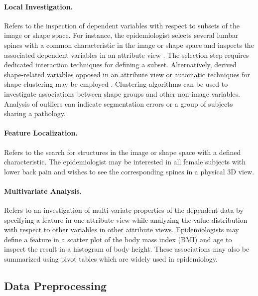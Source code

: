 \documentclass[journal]{style/vgtc} 			          %
\begin{document}
\paragraph{Local Investigation.} Refers to the inspection of dependent variables with respect to subsets of the image or shape space.
%
For instance, the epidemiologist selects several lumbar spines with a common characteristic in the image or shape space and inspects the associated dependent variables in an attribute view \cite{Hermann2014}.
%
The selection step requires dedicated interaction techniques for defining a subset.
%
Alternatively, derived shape-related variables opposed in an attribute view or automatic techniques for shape clustering may be employed \cite{Klemm2013VMV}.
%
Clustering algorithms can be used to investigate associations between shape groups and other non-image variables.
%
Analysis of outliers can indicate segmentation errors or a group of subjects sharing a pathology.

\paragraph{Feature Localization.} Refers to the search for structures in the image or shape space with a defined characteristic.
%
The epidemiologist may be interested in all female subjects with lower back pain and wishes to see the corresponding spines in a physical 3D view.

\paragraph{Multivariate Analysis.} Refers to an investigation of multi-variate properties of the dependent data by specifying a feature in one attribute view while analyzing the value distribution with respect to other variables in other attribute views.
%
Epidemiologists may define a feature in a scatter plot of the body mass index (BMI) and age to inspect the result in a histogram of body height.
%
These associations may also be summarized using pivot tables which are widely used in epidemiology.

\subsection{Data Preprocessing} \label{Data Preprocessing}
\end{document}
